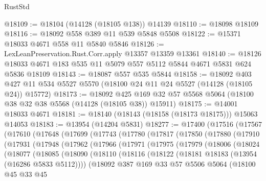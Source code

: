 \begin{lexlean}{RustStd}
\begin{coremodule}
@18109 := @18104 (@14128 (@18105 @138)) @14139
@18110 := @18098 @18109
@18116 := @18092 @558 @389 @11 @539 @5848 @5508
@18122 := @15371 @18033 @4671 @558 @11 @5840 @5846
@18126 := LexLeanPreservation.Rust.Corr.apply @13357 @13359 @13361
@18140 := @18126 @18033 @4671 @183 @535 @11 @5079 @557 @5112 @5844 @4671 @5831 @624 @5836 @18109
@18143 := @18087 @557 @535 @5844
@18158 := @18092
    @403
    @427
    @11
    @534
    @5527
    @5570
    (@18100 @24 @11 @24 @5527 (@14128 (@18105 @24)) @15772)
@18173 := @18092
    @425
    @169
    @32
    @57
    @5568
    @5064
    (@18100 @38 @32 @38 @5568 (@14128 (@18105 @38)) @15911)
@18175 := @14001 @18033 @4671
@18181 := @18140 (@18143 (@18158 (@18173 @18175))) @15063 @14053
@18183 := @13954 (@14204 @5831)
@18277 := @17400
    (@17516
      (@17567
        (@17610
          (@17648
            (@17699
              (@17743
                (@17780
                  (@17817
                    (@17850
                      (@17880
                        (@17910
                          (@17931
                            (@17948
                              (@17962
                                (@17966
                                  (@17971
                                    (@17975
                                      (@17979
                                        (@18006
                                          (@18024
                                            (@18077
                                              (@18085
                                                (@18090
                                                  (@18110
                                                    (@18116
                                                      (@18122
                                                        (@18181
                                                          @18183
                                                          (@13954 (@16286 @5833 @5112))))
                                                      (@18092
                                                        @387
                                                        @169
                                                        @33
                                                        @57
                                                        @5506
                                                        @5064
                                                        (@18100
                                                          @45
                                                          @33
                                                          @45

\end{coremodule}
\end{lexlean}
